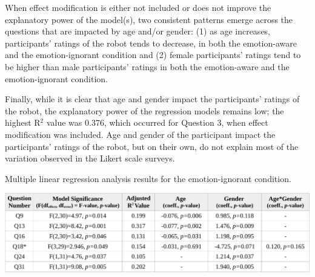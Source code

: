 \documentclass[12pt]{report}
\begin{document}
When effect modification is either not included or does not improve the
explanatory power of the model(s), two consistent patterns emerge across the
questions that are impacted by age and/or gender: (1) as age increases,
participants' ratings of the robot tends to decrease, in both the emotion-aware
and the emotion-ignorant condition and (2) female participants' ratings tend to
be higher than male participants' ratings in both the emotion-aware and the
emotion-ignorant condition.

Finally, while it is clear that age and gender impact the participants' ratings
of the robot, the explanatory power of the regression models remains low; the
highest R$^2$ value was 0.376, which occurred for Question 3, when effect
modification was included. Age and gender of the participant impact the
participants' ratings of the robot, but on their own, do not explain most of the
variation observed in the Likert scale surveys.

\begin{table}[t]
  \centering
  \caption{Multiple linear regression analysis results for the emotion-ignorant
  condition.}
  \label{fig:demographics-results-emotion-ignorance}
  \vspace*{-3mm}
  \includegraphics[width=1\textwidth]{figure/demographics-results-emotion-ignorance-croped.pdf}
\end{table}
\end{document}
